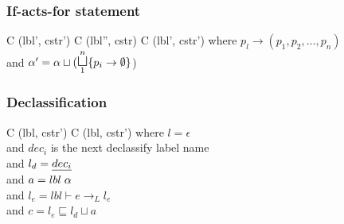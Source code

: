 \subsubsection{If-acts-for statement}

\begin{trules}
        { {C} {(lbl', cstr')} }
        { {C} {(lbl'', cstr)} \;
          {C} {(lbl', cstr')} }
        {where $p_l \rightarrow (p_1, p_2, \dots, p_n)$\\
          and $\ia' = \ia \sqcup (\mathlarger\sqcupl\limits_1^n \{ p_i \rightarrow \emptyset \}$) }
\end{trules}

\subsubsection{Declassification}

\begin{trules}
        { {C} {(lbl, cstr')} }
        { {C} {(lbl, cstr')} }
        {where $l = \epsilon$\\
          and $dec_i$ is the next declassify label name\\
          and $l_d = \underline{dec_i}$\\
          and $a = lbl \; \alpha$\\
          and $l_e = lbl \vdash e \rightarrow_L l_e$\\
          and $c = l_e \sqsubseteq l_d \sqcup a$}
\end{trules}
